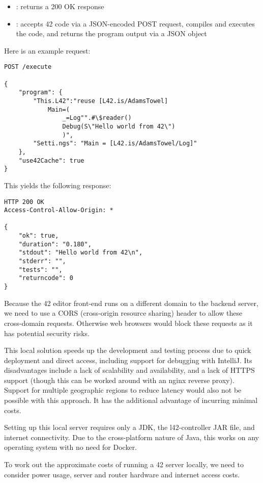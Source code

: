 \begin{itemize}
\item {}: returns a 200 OK response
\item {}: accepts 42 code via a JSON-encoded POST request, compiles and executes the code, and returns the program output via a JSON object
\end{itemize}

Here is an example request:
\begin{lstlisting}[caption=42 API Request]
POST /execute

{
    "program": {
        "This.L42":"reuse [L42.is/AdamsTowel]
            Main=(
                _=Log"".#\$reader()
                Debug(S\"Hello world from 42\")
                )",
        "Setti.ngs": "Main = [L42.is/AdamsTowel/Log]"
    },
    "use42Cache": true
}
\end{lstlisting}

This yields the following response:
\begin{lstlisting}[caption=42 API Response]
HTTP 200 OK
Access-Control-Allow-Origin: *

{
    "ok": true,
    "duration": "0.180",
    "stdout": "Hello world from 42\n",
    "stderr": "",
    "tests": "",
    "returncode": 0
}
\end{lstlisting}

Because the 42 editor front-end runs on a different domain to the backend server, we need to use a CORS (cross-origin resource sharing) header to allow these cross-domain requests. Otherwise web browsers would block these requests as it has potential security risks.

This local solution speeds up the development and testing process due to quick deployment and direct access, including support for debugging with IntelliJ. Its disadvantages include a lack of scalability and availability, and a lack of HTTPS support (though this can be worked around with an nginx reverse proxy). Support for multiple geographic regions to reduce latency would also not be possible with this approach. It has the additional advantage of incurring minimal costs.

Setting up this local server requires only a JDK, the l42-controller JAR file, and internet connectivity. Due to the cross-platform nature of Java, this works on any operating system with no need for Docker.

To work out the approximate costs of running a 42 server locally, we need to consider power usage, server and router hardware and internet access costs.

